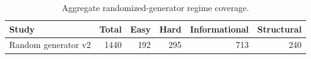 \begin{table}[t]
\centering
\small
\caption{Aggregate randomized-generator regime coverage.}
\label{tab:random_generator_study_v2_compact}
\begin{tabular}{lrrrrr}
\toprule
Study & Total & Easy & Hard & Informational & Structural \\
\midrule
Random generator v2 & 1440 & 192 & 295 & 713 & 240 \\
\bottomrule
\end{tabular}
\end{table}

